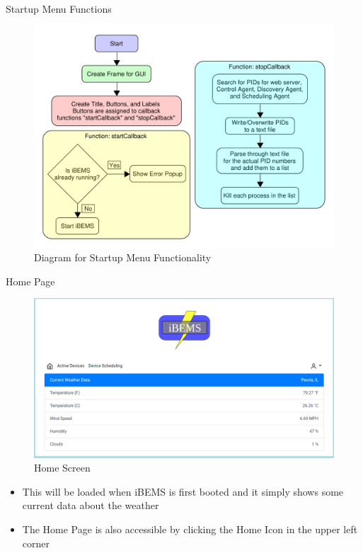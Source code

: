 \documentclass{beamer}
\begin{document}
\begin{frame}{Startup Menu Functions}{}
    \begin{figure}
        \centering
        \includegraphics[scale=0.4]{figs/GUI/GUI_Diagram.pdf}
        \caption{Diagram for Startup Menu Functionality}
        \label{fig:GUI_Diagram}
    \end{figure}
\end{frame}

\begin{frame}{Home Page}{} %
    \begin{figure}
        \centering
        \includegraphics[scale=0.2]{figs/webServer/Home_screen.png}
        \caption{Home Screen}
        \label{fig:Home_screen}
    \end{figure}
    \begin{block}{}
      \begin{small}
        \begin{itemize}
        \item This will be loaded when iBEMS is first booted and it simply shows some current data about the weather 
        \item The Home Page is also accessible by clicking the Home Icon in the upper left corner
        \end{itemize}
      \end{small}
    \end{block}
\end{frame}
\end{document}
